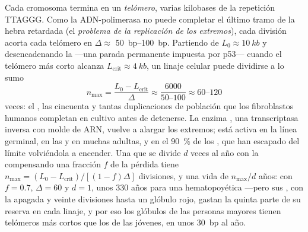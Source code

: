 \begin{theorem}\label{thm:b3:stem-cells:hayflick}
Cada cromosoma termina en un \emph{telómero}, varias kilobases de la
repetición TTAGGG. Como la ADN-polimerasa no puede completar el último
tramo de la hebra retardada (el \emph{problema de la replicación de los
extremos}), cada división acorta cada telómero en
$\Delta \approx$ \qtyrange{50}{100}{bp}. Partiendo de
$L_{0} \approx \qty{10}{kb}$ y desencadenando la \emph{} ---una parada permanente impuesta por p53--- cuando el
telómero más corto alcanza $L_{\text{crit}} \approx \qty{4}{kb}$, un
linaje celular puede dividirse a lo sumo
\[
n_{\max} = \frac{L_{0} - L_{\text{crit}}}{\Delta} \approx \frac{6000}{50\text{--}100} \approx 60\text{--}120
\]
veces: el \emph{}, las cincuenta y tantas
duplicaciones de población que los fibroblastos humanos completan en
cultivo antes de detenerse. La enzima \emph{}, una
transcriptasa inversa con molde de ARN, vuelve a alargar los extremos;
está activa en la línea germinal, en las  y
en muchas adultas, y en el \qty{90}{\%} de los , que han
escapado del límite volviéndola a encender. Una  que se
divide $d$ veces al año con la  compensando una fracción $f$
de la pérdida tiene $n_{\max} = (L_{0} - L_{\text{crit}})/[(1 - f)\Delta]$
divisiones, y una vida de $n_{\max}/d$ años: con $f = 0.7$, $\Delta
= 60$ y $d = 1$, unos 330 años para una  hematopoyética
---pero sus , con la  apagada y veinte divisiones
hasta un glóbulo rojo, gastan la quinta parte de su reserva en cada
linaje, y por eso los glóbulos de las personas mayores tienen telómeros
más cortos que los de las jóvenes, en unos \qty{30}{bp} al año.
\end{theorem}

